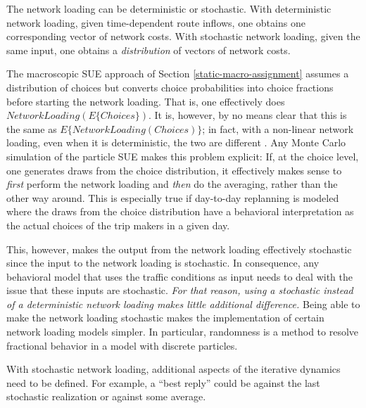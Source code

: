 The network loading can be deterministic or stochastic.  
%
With deterministic network loading, given time-dependent route inflows,
one obtains one corresponding vector of network costs.
%
%
With stochastic network loading, given the same input, one obtains a
\emph{distribution} of vectors of network costs.

The macroscopic SUE approach of Section \ref{static-macro-assignment}
assumes a distribution of choices but
converts choice probabilities into choice fractions before starting
the network loading.  That is, one effectively does $NetworkLoading( E\{ Choices
\})$.  It is, however, by no means
clear that this is the same as $E\{ NetworkLoading( Choices ) \}$; in fact, with
a non-linear network loading, even when it is deterministic,
the two are different \citep{cascetta-1989}. Any Monte Carlo simulation of
the particle SUE makes this problem explicit: If, at the choice level,
one generates draws from the choice distribution, it effectively makes
sense to \emph{first} perform the network loading and \emph{then} do
the averaging, rather than the other way around.
This is especially true if day-to-day replanning is modeled where
the draws from the choice distribution have a
behavioral interpretation as the actual choices of the trip makers
in a given day.

This, however, makes the output from the network loading effectively
stochastic since the input to the network loading is stochastic.  In
consequence, any behavioral model that uses the traffic conditions as
input needs to deal with the issue that these inputs are stochastic.
\emph{For that reason, using a stochastic instead of a deterministic network
loading makes little additional difference.}  Being able to
make the network loading stochastic makes the implementation of
certain network loading models simpler.  
In particular, randomness is a method to
resolve fractional behavior in a model with discrete particles.


With stochastic network loading, additional aspects
of the iterative dynamics need to be defined.  For example, a ``best
reply'' could be against the last stochastic realization or against
some average.

